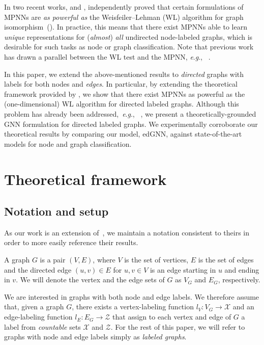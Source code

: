 \documentclass{article} \usepackage{iclr2019_conference,times}
\newcommand{\eg}{\textit{e}.\textit{g}., }
\begin{document}
In two recent works, \cite{Xu2018} and \cite{Morris2018}, independently proved that certain formulations of MPNNs are \emph{as powerful as} the Weisfeiler--Lehman (WL) algorithm for graph isomorphism~(\cite{Weisfeiler1968}). 
In practice, this means that there exist MPNNs able to learn \emph{unique} representations for 
(\emph{almost})
\emph{all}  undirected node-labeled graphs, which is desirable for such tasks as node or graph classification. 
Note that previous work has drawn a parallel between the WL test and the MPNN, \eg ~\cite{Hamilton2017, Jin2017, Lei2017}.

In this paper, we extend the above-mentioned results to \emph{directed} graphs with labels for both nodes and \emph{edges}. In particular, by extending the theoretical framework provided by \cite{Morris2018}, we show that there exist MPNNs as powerful as the (one-dimensional) WL algorithm for directed labeled graphs. Although this problem has already been addressed,~\eg~\cite{Li2015b, Niepert2016, Simonovsky2017, Beck2018, Schlichtkrull2018}, we present a theoretically-grounded GNN formulation for directed labeled graphs. We experimentally corroborate our theoretical results by comparing our model, edGNN, against state-of-the-art models for node and graph classification.












\section{Theoretical framework}
\subsection{Notation and setup}

As our work is an extension of~\cite{Morris2018}, we maintain a notation consistent to theirs in order to more easily reference their results. 

A graph $G$ is a pair $(V,E)$, where $V$ is the set of vertices, $E$ is the set of edges and the directed edge $(u,v) \in E$ for $u, v \in V$ is an edge starting in $u$ and ending in $v$. We will denote the vertex and the edge sets of $G$ as $V_G$ and $E_G$, respectively.

We are interested in graphs with both node and edge labels. We therefore assume that, given a graph $G$, there exists a vertex-labeling function $l_V: V_G \rightarrow \mathcal{X}$ and an edge-labeling function $l_E: E_G \rightarrow \mathcal{Z}$ that assign to each vertex and edge of $G$ a label from \emph{countable} sets $\mathcal{X}$ and $\mathcal{Z}$. For the rest of this paper, we will refer to graphs with node and edge labels simply as \emph{labeled graphs}.
\end{document}
